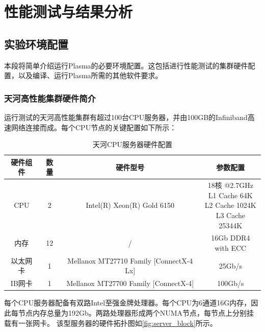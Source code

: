\chapter{性能测试与结果分析}

\section{实验环境配置}

本段将简单介绍运行Plasma的必要环境配置。这包括进行性能测试的集群硬件配置，以及编译、运行Plasma所需的其他软件要求。

\subsection{天河高性能集群硬件简介}

运行测试的天河高性能集群有超过100台CPU服务器，并由100GB的Infiniband高速网络连接而成。每个CPU节点的关键配置如下所示：

\begin{table}[h]
    \centering
    \caption{天河CPU服务器硬件配置}
    \begin{tabular}{*{4}{c}}
        \toprule
        硬件组件  & 数量 & 硬件型号 & 参数配置 \\
        \midrule
        CPU  	 & 2  & Intel(R) Xeon(R) Gold 6150 & \makecell{18核 @2.7GHz \\ L1 Cache 64K \\ L2 Cache 1024K \\ L3 Cache 25344K} \\
        \midrule
        内存 	 & 12 & / & \makecell{16Gb DDR4 \\ with ECC} \\
        \midrule
    	以太网卡 & 1  & Mellanox MT27710 Family [ConnectX-4 Lx]   & 25Gb/s \\
    	IB网卡   & 1  & Mellanox MT27700 Family [ConnectX-4] & 100Gb/s \\
        \bottomrule
    \end{tabular}
    \label{tab:hardware_config}
\end{table}

每个CPU服务器配备有双路Intel至强金牌处理器。每个CPU为6通道16G内存，因此每节点内存总量为192Gb。两路处理器形成两个NUMA节点，每节点上分别挂载有一张网卡。
该型服务器的硬件拓扑图如\autoref{fig:server_block}所示。

